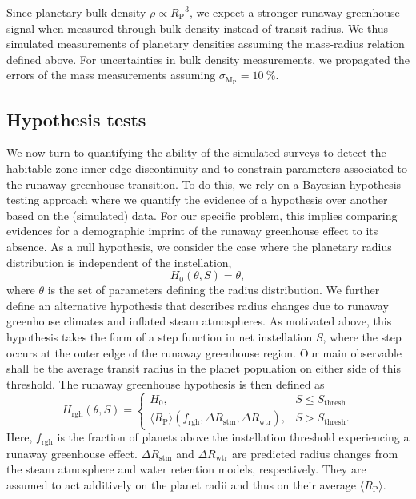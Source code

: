 \documentclass[twocolumn,twocolappendix]{aastex631}
\begin{document}
Since planetary bulk density $\rho \propto R_\mathrm{P}^{-3}$, we expect a stronger runaway greenhouse signal when measured through bulk density instead of transit radius.
We thus simulated measurements of planetary densities assuming the mass-radius relation defined above.
For uncertainties in bulk density measurements, we propagated the errors of the mass measurements assuming $\sigma_\mathrm{M_\mathrm{P}} = \SI{10}{\percent}$.


\subsection{Hypothesis tests}
We now turn to quantifying the ability of the simulated surveys to detect the habitable zone inner edge discontinuity and to constrain parameters associated to the runaway greenhouse transition.
To do this, we rely on a Bayesian hypothesis testing approach where we quantify the evidence of a hypothesis over another based on the (simulated) data.
For our specific problem, this implies comparing evidences for a demographic imprint of the runaway greenhouse effect to its absence.
    As a null hypothesis, we consider the case where the planetary radius distribution is independent of the instellation,
    \begin{equation}
        H_0(\theta, S) = \theta,
    \end{equation}
    where $\theta$ is the set of parameters defining the radius distribution.
    We further define an alternative hypothesis that describes radius changes due to runaway greenhouse climates and inflated steam atmospheres.
    As motivated above, this hypothesis takes the form of a step function in net instellation $S$, where the step occurs at the outer edge of the runaway greenhouse region.
    Our main observable shall be the average transit radius in the planet population on either side of this threshold.
    The runaway greenhouse hypothesis is then defined as
\begin{equation}\label{eq:rgh_hypo}
    H_{\mathrm{rgh}}(\theta, S) =
        \begin{cases}
            H_0, &  S \leq S_\mathrm{thresh}\\
            \langle R_\mathrm{P}\rangle (f_\mathrm{rgh},\Delta R_\mathrm{stm}, \Delta R_\mathrm{wtr}), &  S > S_\mathrm{thresh}.
        \end{cases}
\end{equation}
    Here, $f_\mathrm{rgh}$ is the fraction of planets above the instellation threshold experiencing a runaway greenhouse effect.
    $\Delta R_\mathrm{stm}$ and $\Delta R_\mathrm{wtr}$ are predicted radius changes from the steam atmosphere and water retention models, respectively.
    They are assumed to act additively on the planet radii and thus on their average $\langle R_\mathrm{P}\rangle $.
\end{document}
